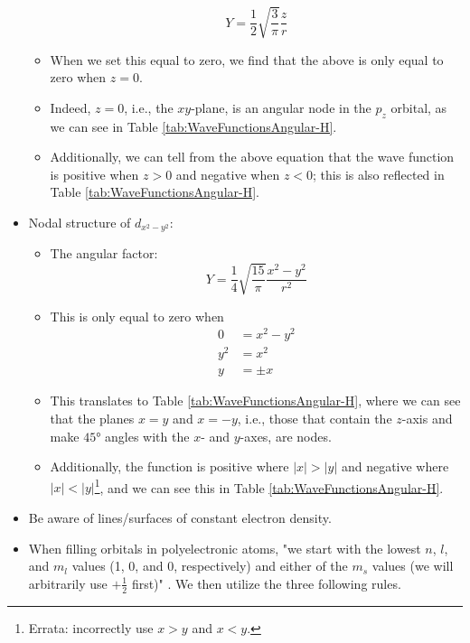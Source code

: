 \documentclass[../main.tex]{subfiles}
\begin{document}
\begin{itemize}
\begin{itemize}
\begin{equation*}
            Y = \frac{1}{2}\sqrt{\frac{3}{\pi}}\frac{z}{r}
        \end{equation*}
        \item When we set this equal to zero, we find that the above is only equal to zero when $z=0$.
        \item Indeed, $z=0$, i.e., the $xy$-plane, is an angular node in the $p_z$ orbital, as we can see in Table \ref{tab:WaveFunctionsAngular-H}.
        \item Additionally, we can tell from the above equation that the wave function is positive when $z>0$ and negative when $z<0$; this is also reflected in Table \ref{tab:WaveFunctionsAngular-H}.
    \end{itemize}
    \item Nodal structure of $d_{x^2-y^2}$:
    \begin{itemize}
        \item The angular factor:
        \begin{equation*}
            Y = \frac{1}{4}\sqrt{\frac{15}{\pi}}\frac{x^2-y^2}{r^2}
        \end{equation*}
        \item This is only equal to zero when
        \begin{align*}
            0 &= x^2-y^2\\
            y^2 &= x^2\\
            y &= \pm x
        \end{align*}
        \item This translates to Table \ref{tab:WaveFunctionsAngular-H}, where we can see that the planes $x=y$ and $x=-y$, i.e., those that contain the $z$-axis and make $\ang{45}$ angles with the $x$- and $y$-axes, are nodes.
        \item Additionally, the function is positive where $|x|>|y|$ and negative where $|x|<|y|$\footnote{Errata: \textcite{bib:MiesslerFischerTarr} incorrectly use $x>y$ and $x<y$.}, and we can see this in Table \ref{tab:WaveFunctionsAngular-H}.
    \end{itemize}
    \item Be aware of lines/surfaces of constant electron density.
    \item When filling orbitals in polyelectronic atoms, "we start with the lowest $n$, $l$, and $m_l$ values (1, 0, and 0, respectively) and either of the $m_s$ values (we will arbitrarily use $+\frac{1}{2}$ first)" \parencite[26]{bib:MiesslerFischerTarr}. We then utilize the three following rules.
    \begin{itemize}

\end{itemize}
\end{itemize}
\end{document}
